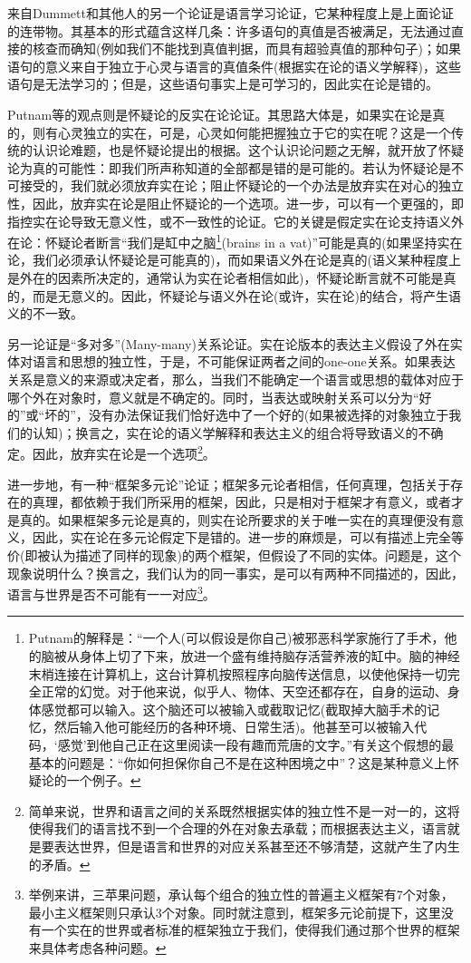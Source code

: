 \documentclass{article}
\begin{document}
来自Dummett和其他人的另一个论证是{\heiti 语言学习论证}，它某种程度上是上面论证的连带物。其基本的形式蕴含这样几条：许多语句的真值是否被满足，无法通过直接的核查而确知(例如我们不能找到真值判据，而具有超验真值的那种句子)；如果语句的意义来自于独立于心灵与语言的真值条件(根据实在论的语义学解释)，这些语句是无法学习的；但是，这些语句事实上是可学习的，因此实在论是错的。

Putnam等的观点则是怀疑论的反实在论论证。其思路大体是，如果实在论是真的，则有心灵独立的实在，可是，心灵如何能把握独立于它的实在呢？这是一个传统的认识论难题，也是怀疑论提出的根据。这个认识论问题之无解，就开放了怀疑论为真的可能性：即我们所声称知道的全部都是错的是可能的。若认为怀疑论是不可接受的，我们就必须放弃实在论；阻止怀疑论的一个办法是放弃实在对心的独立性，因此，放弃实在论是阻止怀疑论的一个选项。进一步，可以有一个更强的，即指控实在论导致无意义性，或不一致性的论证。它的关键是假定实在论支持语义外在论：怀疑论者断言“我们是缸中之脑\footnote{Putnam的解释是：“一个人(可以假设是你自己)被邪恶科学家施行了手术，他的脑被从身体上切了下来，放进一个盛有维持脑存活营养液的缸中。脑的神经末梢连接在计算机上，这台计算机按照程序向脑传送信息，以使他保持一切完全正常的幻觉。对于他来说，似乎人、物体、天空还都存在，自身的运动、身体感觉都可以输入。这个脑还可以被输入或截取记忆(截取掉大脑手术的记忆，然后输入他可能经历的各种环境、日常生活)。他甚至可以被输入代码，‘感觉’到他自己正在这里阅读一段有趣而荒唐的文字。”有关这个假想的最基本的问题是：“你如何担保你自己不是在这种困境之中”？这是某种意义上怀疑论的一个例子。}(brains in a vat)”可能是真的(如果坚持实在论，我们必须承认怀疑论是可能真的)，而如果语义外在论是真的(语义某种程度上是外在的因素所决定的，通常认为实在论者相信如此)，怀疑论断言就不可能是真的，而是无意义的。因此，怀疑论与语义外在论(或许，实在论)的结合，将产生语义的不一致。

另一论证是“多对多”(Many-many)关系论证。实在论版本的表达主义假设了外在实体对语言和思想的独立性，于是，不可能保证两者之间的one-one关系。如果表达关系是意义的来源或决定者，那么，当我们不能确定一个语言或思想的载体对应于哪个外在对象时，意义就是不确定的。同时，当表达或映射关系可以分为“好的”或“坏的”，没有办法保证我们恰好选中了一个好的(如果被选择的对象独立于我们的认知)；换言之，实在论的语义学解释和表达主义的组合将导致语义的不确定。因此，放弃实在论是一个选项\footnote{简单来说，世界和语言之间的关系既然根据实体的独立性不是一对一的，这将使得我们的语言找不到一个合理的外在对象去承载；而根据表达主义，语言就是要表达世界，但是语言和世界的对应关系甚至还不够清楚，这就产生了内生的矛盾。}。

进一步地，有一种“框架多元论”论证；框架多元论者相信，任何真理，包括关于存在的真理，都依赖于我们所采用的框架，因此，只是相对于框架才有意义，或者才是真的。如果框架多元论是真的，则实在论所要求的关于唯一实在的真理便没有意义，因此，实在论在多元论假定下是错的。进一步的麻烦是，可以有描述上完全等价(即被认为描述了同样的现象)的两个框架，但假设了不同的实体。问题是，这个现象说明什么？换言之，我们认为的同一事实，是可以有两种不同描述的，因此，语言与世界是否不可能有一一对应\footnote{举例来讲，三苹果问题，承认每个组合的独立性的普遍主义框架有7个对象，最小主义框架则只承认3个对象。同时就注意到，框架多元论前提下，这里没有一个实在的世界或者标准的框架独立于我们，使得我们通过那个世界的框架来具体考虑各种问题。}。
\end{document}
